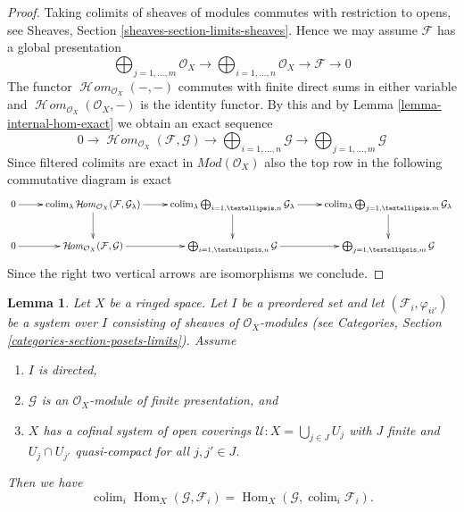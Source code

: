 \documentclass{stacks-project}
\theoremstyle{plain}
\newtheorem{lemma}[subsection]{Lemma}
\theoremstyle{definition}
\theoremstyle{remark}
\numberwithin{equation}{subsection}
\def\colim{\mathop{\mathrm{colim}}\nolimits}
\def\Hom{\mathop{\mathrm{Hom}}\nolimits}
\def\SheafHom{\mathop{\mathcal{H}\!\mathit{om}}\nolimits}
\begin{document}
\begin{proof}
Taking colimits of sheaves of modules commutes with restriction to opens, see
Sheaves, Section \ref{sheaves-section-limits-sheaves}. Hence we may assume
$\mathcal{F}$ has a global presentation
$$
\bigoplus\nolimits_{j = 1, \ldots, m}
\mathcal{O}_X
\longrightarrow
\bigoplus\nolimits_{i = 1, \ldots, n}
\mathcal{O}_X
\to
\mathcal{F}
\to
0
$$
The functor $\SheafHom_{\mathcal{O}_X}(-, -)$ commutes with finite direct sums
in either variable and $\SheafHom_{\mathcal{O}_X}(\mathcal{O}_X, -)$
is the identity functor. By this and by Lemma \ref{lemma-internal-hom-exact}
we obtain an exact sequence
$$
0 \to
\SheafHom_{\mathcal{O}_X}(\mathcal{F}, \mathcal{G}) \to
\bigoplus\nolimits_{i = 1, \ldots, n} \mathcal{G} \to
\bigoplus\nolimits_{j = 1, \ldots, m} \mathcal{G}
$$
Since filtered colimits are exact in $\textit{Mod}(\mathcal{O}_X)$
also the top row in the following commutative diagram is exact
$$
\xymatrix{
0 \ar[r] &
\colim_\lambda \SheafHom_{\mathcal{O}_X}(\mathcal{F}, \mathcal{G}_\lambda)
\ar[r] \ar[d] &
\colim_\lambda \bigoplus\nolimits_{i = 1, \ldots, n} \mathcal{G}_\lambda
\ar[r] \ar[d] &
\colim_\lambda \bigoplus\nolimits_{j = 1, \ldots, m} \mathcal{G}_\lambda
\ar[d] \\
0 \ar[r] &
\SheafHom_{\mathcal{O}_X}(\mathcal{F}, \mathcal{G}) \ar[r] &
\bigoplus\nolimits_{i = 1, \ldots, n} \mathcal{G} \ar[r] &
\bigoplus\nolimits_{j = 1, \ldots, m} \mathcal{G}
}
$$
Since the right two vertical arrows are isomorphisms we conclude.
\end{proof}

\begin{lemma}
\label{lemma-finite-presentation-quasi-compact-colimit}
Let $X$ be a ringed space.
Let $I$ be a preordered set and
let $(\mathcal{F}_i, \varphi_{ii'})$ be a system over $I$
consisting of sheaves of $\mathcal{O}_X$-modules
(see Categories, Section \ref{categories-section-posets-limits}).
Assume
\begin{enumerate}
\item $I$ is directed,
\item $\mathcal{G}$ is an $\mathcal{O}_X$-module of finite presentation, and
\item $X$ has a cofinal system of open coverings
$\mathcal{U} : X = \bigcup_{j\in J} U_j$ with
$J$ finite and $U_j \cap U_{j'}$ quasi-compact
for all $j, j' \in J$.
\end{enumerate}
Then we have
$$
\colim_i \Hom_X(\mathcal{G}, \mathcal{F}_i)
=
\Hom_X(\mathcal{G}, \colim_i \mathcal{F}_i).
$$
\end{lemma}
\end{document}
